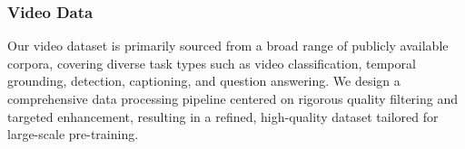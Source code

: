 \documentclass{article}
\begin{document}

\subsubsection{Video Data} \label{sec:pretrain_video_data} %
Our video dataset is primarily sourced from a broad range of publicly available corpora, covering diverse task types such as video classification, temporal grounding, detection, captioning, and question answering. We design a comprehensive data processing pipeline centered on rigorous quality filtering and targeted enhancement, resulting in a refined, high-quality dataset tailored for large-scale pre-training.
\end{document}
